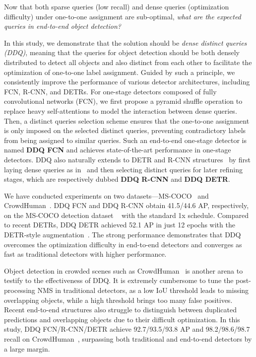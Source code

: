 \documentclass[10pt,twocolumn,letterpaper]{article}
\begin{document}
Now that both sparse queries (low recall) and dense queries (optimization difficulty) under one-to-one assignment are sub-optimal, \emph{what are the expected queries in
end-to-end object detection?}

In this study, we demonstrate that the solution should be \emph{dense distinct queries (DDQ)}, meaning that the queries for object detection should be both densely distributed to detect all objects and also distinct from each other to facilitate the optimization of one-to-one label assignment. Guided by such a principle, we consistently improve the performance of various detector architectures, including FCN, R-CNN, and DETRs. For one-stage detectors composed of fully convolutional networks (FCN), we first propose a pyramid shuffle operation to replace heavy self-attentions to model the interaction between dense queries. Then, a distinct queries selection scheme ensures that the one-to-one assignment is only imposed on the selected distinct queries, preventing contradictory labels from being assigned to similar queries.  Such an end-to-end one-stage detector is named \textbf{DDQ FCN} and achieves state-of-the-art performance in one-stage detectors. DDQ also naturally extends to DETR and R-CNN structures~\cite{zhu2020deformable, liu2021dab, dai2021dynamicdetr, sun2021sparse} by first laying dense queries as in~\cite{zhu2020deformable} and then selecting distinct queries for later refining stages, which are respectively dubbed \textbf{DDQ R-CNN} and \textbf{DDQ DETR}.


We have conducted experiments on two datasets---MS-COCO~\cite{lin2014microsoft} and CrowdHuman~\cite{shao2018crowdhuman}.  DDQ FCN and DDQ R-CNN obtain 41.5/44.6 AP, respectively, on the MS-COCO detection dataset ~\cite{lin2014microsoft} with the standard 1x schedule\cite{ren2015faster,lin2017focal}. Compared to recent DETRs, DDQ DETR achieved 52.1 AP in just 12 epochs with the DETR-style augmentation~\cite{carion2020end}.  The strong performance demonstrates that DDQ overcomes the optimization difficulty in end-to-end detectors and converges as fast as traditional detectors with higher performance. 

Object detection in crowded scenes such as CrowdHuman~\cite{shao2018crowdhuman} is another arena to testify to the effectiveness of DDQ. It is extremely cumbersome to tune the post-processing NMS in traditional detectors, as a low IoU threshold leads to missing overlapping objects, while a high threshold brings too many false positives. Recent end-to-end structures also struggle to distinguish between duplicated predictions and overlapping objects due to their difficult optimization. In this study, DDQ FCN/R-CNN/DETR achieve  92.7/93.5/93.8 AP and 98.2/98.6/98.7 recall on CrowdHuman~\cite{shao2018crowdhuman}, surpassing both traditional and end-to-end detectors by a large margin. 
\end{document}
